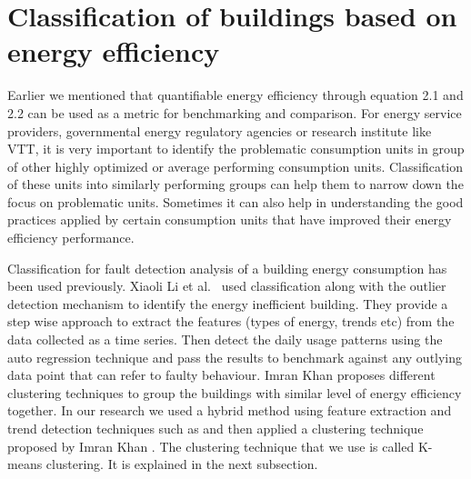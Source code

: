 \section{Classification of buildings based on energy efficiency}\label{classify}

Earlier we mentioned that quantifiable energy efficiency through equation 2.1 and 2.2 can be used as a metric for benchmarking and comparison. For energy service providers, governmental energy regulatory agencies or research institute like VTT, it is very important to identify the problematic consumption units in group of other highly optimized or average performing consumption units. Classification of these units into similarly performing groups can help them to narrow down the focus on problematic units. Sometimes it can also help in understanding the good practices applied by certain consumption units that have improved their energy efficiency performance.
  
Classification for fault detection analysis of a building energy consumption has been used previously. Xiaoli Li et al.\ \cite{li2010classification} used classification along with the outlier detection mechanism to identify the energy inefficient building. They provide a step wise approach to extract the features (types of energy, trends etc) from the data collected as a time series. Then detect the daily usage patterns using the auto regression technique and pass the results to benchmark against any outlying data point that can refer to faulty behaviour. Imran Khan \cite{khan2013fault} proposes different clustering techniques to group the buildings with similar level of energy efficiency together. In our research we used a hybrid method using feature extraction and trend detection techniques such as \cite{li2010classification} and then applied a clustering technique proposed by Imran Khan \cite{khan2013fault}. The clustering technique that we use is called K-means clustering. It is explained in the next subsection. 

